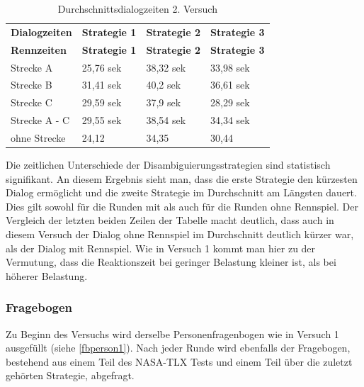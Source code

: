 \documentclass[12pt,a4paper]{scrartcl}
\begin{document}
\begin{longtable}{p{3cm}p{3cm}p{3cm}p{3cm} }
	\label{Durchschnittsdialogzeiten2}\\
	\caption[Durchschnittsdialogzeiten 2. Versuch]{Durchschnittsdialogzeiten 2. Versuch}\\
	\hline
	\textbf{Dialogzeiten}&\textbf{Strategie 1}&\textbf{Strategie 2} &\textbf{Strategie 3}\\
	\hline
	\endfirsthead
	\hline
	\textbf{Rennzeiten}&\textbf{Strategie 1}&\textbf{Strategie 2} &\textbf{Strategie 3}\\
	\hline
	\endhead
Strecke A & 25,76 sek & 38,32 sek & 33,98 sek \\
Strecke B & 31,41 sek & 40,2 sek & 36,61 sek \\
Strecke C  & 29,59 sek & 37,9 sek & 28,29 sek \\
\hline
\hline
Strecke A - C & 29,55 sek & 38,54 sek & 34,34 sek\\
\hline
ohne Strecke & 24,12 & 34,35 & 30,44 \\
\hline
\end{longtable}

Die zeitlichen Unterschiede der Disambiguierungsstrategien sind statistisch signifikant. An diesem Ergebnis sieht man, dass die erste Strategie den kürzesten Dialog ermöglicht und die zweite Strategie im Durchschnitt am Längsten dauert. Dies gilt sowohl für die Runden mit als auch für die Runden ohne Rennspiel. Der Vergleich der letzten beiden Zeilen der Tabelle macht deutlich, dass auch in diesem Versuch der Dialog ohne Rennspiel im Durchschnitt deutlich kürzer war, als der Dialog mit Rennspiel. Wie in Versuch 1 kommt man hier zu der Vermutung, dass die Reaktionszeit bei geringer Belastung kleiner ist, als bei höherer Belastung.  

\subsubsection{Fragebogen}
\label{fragebogen2}
Zu Beginn des Versuchs wird derselbe Personenfragenbogen wie in Versuch 1 ausgefüllt (siehe \ref{fbperson1}). Nach jeder Runde wird ebenfalls der Fragebogen, bestehend aus einem Teil des NASA-TLX Tests und einem Teil über die zuletzt gehörten Strategie, abgefragt.
\end{document}

